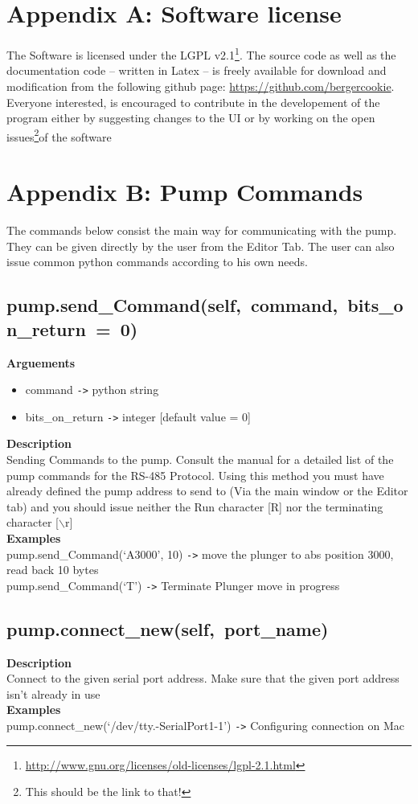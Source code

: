 \documentclass[a4paper]{article}
\begin{document}
\section{Appendix A: Software license}
\label{sec:license}
The Software is licensed under the LGPL v2.1\footnote{\url{http://www.gnu.org/licenses/old-licenses/lgpl-2.1.html}}.
The source code as well as the documentation code -- written in Latex -- is 
freely available for download and modification from the following github page:
\url{https://github.com/bergercookie}.
Everyone interested, is encouraged to contribute in the developement of the program
either by suggesting changes to the UI or by working on the open issues\footnote{This should be the link to that!}of the software

\section{Appendix B: Pump Commands}
The commands below consist the main way for communicating with the pump.
They can be given directly by the user from the Editor Tab.
The user can also issue common python commands according to his own
needs.

\subsection{\mbox{pump.send\_Command(self, command, bits\_on\_return = 0)}}
\textbf{Arguements}
\begin{itemize}
    \item command \verb|->| python string
    \item bits\_on\_return \verb|->| integer [default value = 0]
\end{itemize}
\textbf{Description}\\
Sending Commands to the pump.
Consult the manual for a detailed list of the pump commands for the RS-485 Protocol. 
Using this method you must have already defined the pump address to send to (Via
the main window or the Editor tab) and you should issue neither 
the Run character [R] nor the terminating character [$\backslash$r]\\
\textbf{Examples}\\
pump.send\_Command(`A3000', 10) \verb|->| move the plunger to abs position 3000, read back 10 bytes\\
pump.send\_Command(`T') \verb|->| Terminate Plunger move in progress

\subsection{\mbox{pump.connect\_new(self, port\_name)}}
\textbf{Description}\\
Connect to the given serial port address.
Make sure that the given port address isn't already in use\\
\textbf{Examples}\\
pump.connect\_new(`/dev/tty.-SerialPort1-1') \verb|->| Configuring connection on Mac
\end{document}
